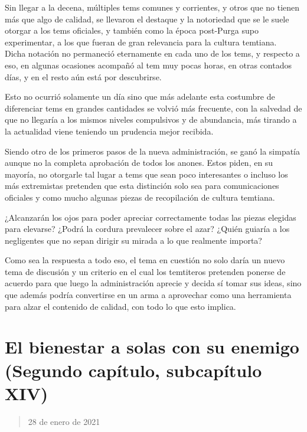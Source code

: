 \documentclass[
  spanish,
]{book}
\begin{document}
Sin llegar a la decena, múltiples tems comunes y corrientes, y otros que no tienen más que algo de calidad, se llevaron el destaque y la notoriedad que se le suele otorgar a los tems oficiales, y también como la época post-Purga supo experimentar, a los que fueran de gran relevancia para la cultura temtiana.\\
Dicha notación no permaneció eternamente en cada uno de los tems, y respecto a eso, en algunas ocasiones acompañó al tem muy pocas horas, en otras contados días, y en el resto aún está por descubrirse.

Esto no ocurrió solamente un día sino que más adelante esta costumbre de diferenciar tems en grandes cantidades se volvió más frecuente, con la salvedad de que no llegaría a los mismos niveles compulsivos y de abundancia, más tirando a la actualidad viene teniendo un prudencia mejor recibida.

Siendo otro de los primeros pasos de la nueva administración, se ganó la simpatía aunque no la completa aprobación de todos los anones. Estos piden, en su mayoría, no otorgarle tal lugar a tems que sean poco interesantes o incluso los más extremistas pretenden que esta distinción solo sea para comunicaciones oficiales y como mucho algunas piezas de recopilación de cultura temtiana.

¿Alcanzarán los ojos para poder apreciar correctamente todas las piezas elegidas para elevarse? ¿Podrá la cordura prevalecer sobre el azar? ¿Quién guiaría a los negligentes que no sepan dirigir su mirada a lo que realmente importa?

Como sea la respuesta a todo eso, el tema en cuestión no solo daría un nuevo tema de discusión y un criterio en el cual los temtiteros pretenden ponerse de acuerdo para que luego la administración aprecie y decida sí tomar sus ideas, sino que además podría convertirse en un arma a aprovechar como una herramienta para alzar el contenido de calidad, con todo lo que esto implica.

\hypertarget{el-bienestar-a-solas-con-su-enemigo-segundo-capuxedtulo-subcapuxedtulo-xiv}{%
\section{El bienestar a solas con su enemigo (Segundo capítulo, subcapítulo XIV)}\label{el-bienestar-a-solas-con-su-enemigo-segundo-capuxedtulo-subcapuxedtulo-xiv}}

\begin{quote}
28 de enero de 2021
\end{quote}
\end{document}
